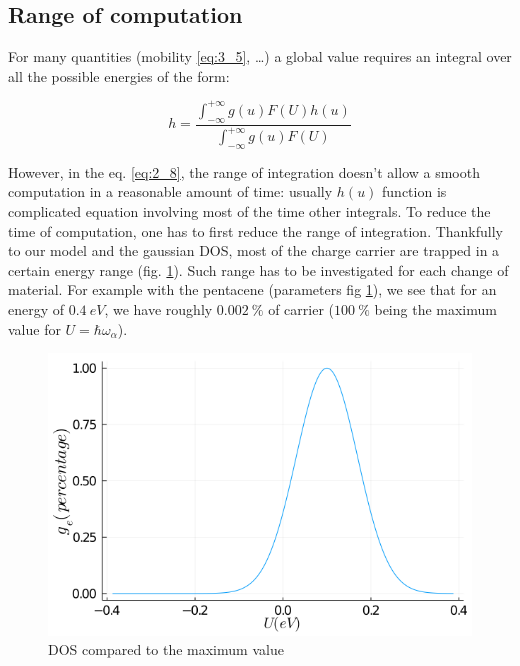 \subsection{Range of computation \label{subsection:range}}

For many quantities (mobility \ref{eq:3_5}, \dots) a global value requires an integral over all the possible energies of the form:

\begin{equation}
    h = \frac{\int_{-\infty}^{+\infty}g(u)F(U)h(u)}{\int_{-\infty}^{+\infty}g(u)F(U)}
    \label{eq:2_8}
\end{equation}

However, in the eq. \ref{eq:2_8}, the range of integration doesn't allow a smooth computation in a reasonable amount of time: usually $h(u)$ function is complicated equation involving most of the time other integrals. To reduce the time of computation, one has to first reduce the range of integration. Thankfully to our model and the gaussian DOS, most of the charge carrier are trapped in a certain energy range (fig. \ref{fig:2_2}). Such range has to be investigated for each change of material. For example with the pentacene (parameters fig \ref{fig:2_2}), we see that for an energy of $\SI{0.4}{eV}$, we have roughly $\SI{0.002}{\percent}$ of carrier ($\SI{100}{\percent}$ being the maximum value for $U = \hbar \omega_\alpha$).

\begin{figure}
    \centering
    \includegraphics*[width=.6\paperwidth]{figures/2-julia/DOS.png}
    \caption{DOS compared to the maximum value \label{fig:2_2}}
\end{figure}

